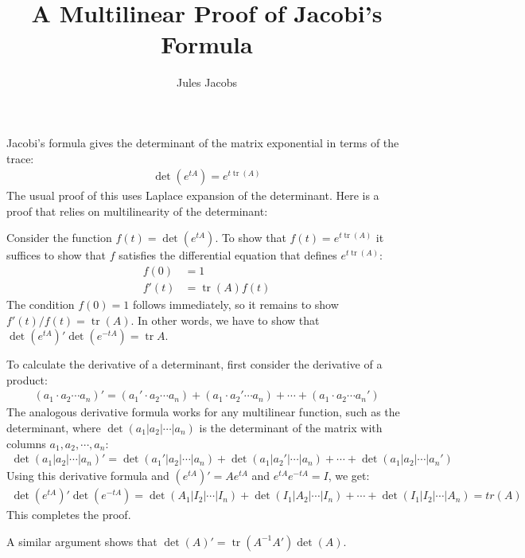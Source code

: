 

\newcommand{\tac}[1]{\lstinline[mathescape]~#1~}
\newcommand{\ciff}{\ \leftrightarrow\ }
\newcommand{\hyp}{\tac{H}}
\newcommand{\hypB}{\tac{G}}
\newcommand{\var}{\tac{x}}
\newcommand{\varB}{\tac{y}}

\newtheorem*{nlemma}{Lemma}

\DeclareMathOperator*{\tr}{tr}



\title{A Multilinear Proof of Jacobi's Formula}
\author{Jules Jacobs}


\maketitle

Jacobi's formula gives the determinant of the matrix exponential in terms of the trace:
\begin{align*}
  \det(e^{tA}) = e^{t\tr(A)}
\end{align*}
The usual proof of this uses Laplace expansion of the determinant.
Here is a proof that relies on multilinearity of the determinant:

Consider the function $f(t) = \det(e^{tA})$. To show that $f(t) = e^{t\tr(A)}$ it suffices to show that $f$ satisfies the differential equation that defines $e^{t\tr(A)}$:
\begin{align*}
  f(0) &= 1\\
  f'(t) &= \tr(A)f(t)
\end{align*}
The condition $f(0) = 1$ follows immediately, so it remains to show $f'(t)/f(t) = \tr(A)$.
In other words, we have to show that $\det(e^{tA})'\det(e^{-tA}) = \tr{A}$.

To calculate the derivative of a determinant, first consider the derivative of a product:
\begin{align*}
  (a_1 \cdot a_2 \cdots a_n)' = (a_1' \cdot a_2 \cdots a_n)
                              + (a_1 \cdot a_2' \cdots a_n)
                              + \cdots
                              + (a_1 \cdot a_2 \cdots a_n')
\end{align*}
The analogous derivative formula works for any multilinear function, such as the determinant,
where $\det(a_1 | a_2 | \cdots |a_n)$ is the determinant of the matrix with columns $a_1, a_2, \cdots, a_n$:
\begin{align*}
  \det(a_1 | a_2 | \cdots |a_n)' = \det(a_1'| a_2 | \cdots | a_n)
                                 + \det(a_1 | a_2'| \cdots | a_n)
                                 + \cdots
                                 + \det(a_1 | a_2 | \cdots | a_n')
\end{align*}
Using this derivative formula and $(e^{tA})' = Ae^{tA}$ and $e^{tA}e^{-tA} = I$, we get:
\begin{align*}
  \det(e^{tA})'\det(e^{-tA})
                = \det(A_1 | I_2 | \cdots | I_n)
                + \det(I_1 | A_2 | \cdots | I_n)
                + \cdots
                + \det(I_1 | I_2 | \cdots | A_n)
                = tr(A)
\end{align*}
This completes the proof.

A similar argument shows that $\det(A)' = \tr(A^{-1}A')\det(A)$.



